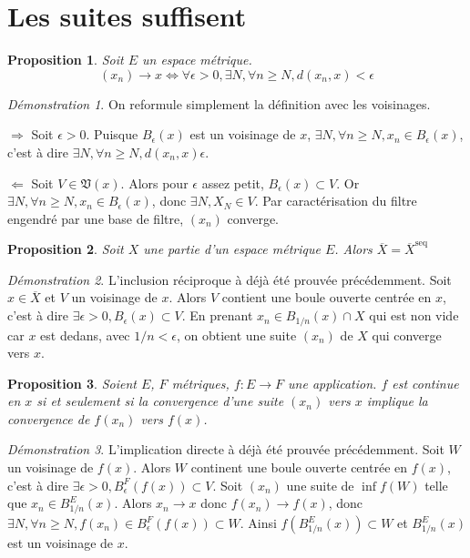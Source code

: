 \documentclass[a4paper, 11pt, french]{book}
\newenvironment{itemise}{\itemize}{\enditemize}
\theoremstyle{plain} %
\newtheorem{proposition}{Proposition}
\theoremstyle{definition} %
\theoremstyle{remark} %
\newtheorem*{demonstration}{Démonstration}
\newcommand{\1}{\mathds{1}}
\newcommand{\supegal}{\geqslant}
\begin{document}
\section{Les suites suffisent}

\begin{proposition}
	Soit $E$ un espace métrique.
	$$
		(x_n)\rightarrow x
		\iff
		\forall\epsilon>0, \exists N, \forall n\supegal N, d(x_n, x)<\epsilon
	$$
\end{proposition}

\begin{demonstration}
	On reformule simplement la définition avec les voisinages.
	\begin{itemise}
		\item[$\Rightarrow$] Soit $\epsilon>0$.
		Puisque $B_\epsilon(x)$ est un voisinage de $x$, $\exists N, \forall n\supegal N, x_n\in B_\epsilon(x)$, c'est à dire $\exists N, \forall n\supegal N, d(x_n, x)\epsilon$.
		\item[$\Leftarrow$] Soit $V\in\mathfrak{V}(x)$.
		Alors pour $\epsilon$ assez petit, $B_\epsilon(x)\subset V$.
		Or $\exists N, \forall n\supegal N, x_n\in B_\epsilon(x)$, donc $\exists N, X_N\in V$.
		Par caractérisation du filtre engendré par une base de filtre, $(x_n)$ converge.
	\end{itemise}
\end{demonstration}

\begin{proposition}
	Soit $X$ une partie d'un espace métrique $E$.
	Alors $\overline{X}=\overline{X}^\text{seq}$
\end{proposition}

\begin{demonstration}
	L'inclusion réciproque à déjà été prouvée précédemment.
	Soit $x\in\overline{X}$ et $V$ un voisinage de $x$.
	Alors $V$ contient une boule ouverte centrée en $x$, c'est à dire $\exists\epsilon>0, B_\epsilon(x)\subset V$.
	En prenant $x_n\in B_{1/n}(x)\cap X$ qui est non vide car $x$ est dedans, avec $1/n<\epsilon$, on obtient une suite $(x_n)$ de $X$ qui converge vers $x$.
\end{demonstration}

\begin{proposition}
	Soient $E$, $F$ métriques, $f:E\rightarrow F$ une application.
	$f$ est continue en $x$ si et seulement si la convergence d'une suite $(x_n)$ vers $x$ implique la convergence de $f(x_n)$ vers $f(x)$.
\end{proposition}

\begin{demonstration}
	L'implication directe à déjà été prouvée précédemment.
	Soit $W$ un voisinage de $f(x)$.
	Alors $W$ continent une boule ouverte centrée en $f(x)$, c'est à dire $\exists\epsilon>0, B^F_\epsilon(f(x))\subset V$.
	Soit $(x_n)$ une suite de $\inf{f}(W)$ telle que $x_n\in B^E_{1/n}(x)$.
	Alors $x_n\rightarrow x$ donc $f(x_n)\rightarrow f(x)$, donc $\exists N, \forall n\supegal N, f(x_n)\in B^F_\epsilon(f(x))\subset W$.
	Ainsi $f(B^E_{1/n}(x))\subset W$ et $B^E_{1/n}(x)$ est un voisinage de $x$.
\end{demonstration}
\end{document}
